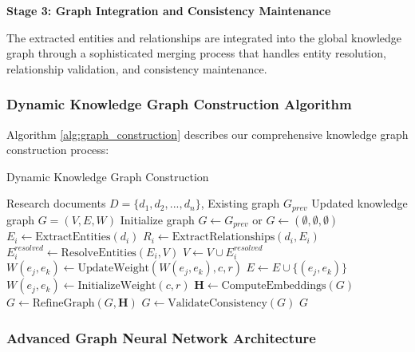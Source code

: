 \documentclass[10pt,twocolumn]{article}
\begin{document}
\textbf{Stage 3: Graph Integration and Consistency Maintenance}

The extracted entities and relationships are integrated into the global knowledge graph through a sophisticated merging process that handles entity resolution, relationship validation, and consistency maintenance.

\subsubsection{Dynamic Knowledge Graph Construction Algorithm}

Algorithm \ref{alg:graph_construction} describes our comprehensive knowledge graph construction process:

\begin{algorithm}[H]
\caption{Dynamic Knowledge Graph Construction}
\label{alg:graph_construction}
\begin{algorithmic}[1]
\REQUIRE Research documents $D = \{d_1, d_2, ..., d_n\}$, Existing graph $G_{prev}$
\ENSURE Updated knowledge graph $G = (V, E, W)$
\STATE Initialize graph $G \leftarrow G_{prev}$ or $G \leftarrow (\emptyset, \emptyset, \emptyset)$
    \STATE $E_i \leftarrow \text{ExtractEntities}(d_i)$ 
    \STATE $R_i \leftarrow \text{ExtractRelationships}(d_i, E_i)$ 
    \STATE $E_i^{resolved} \leftarrow \text{ResolveEntities}(E_i, V)$
    \STATE $V \leftarrow V \cup E_i^{resolved}$
            \STATE $W(e_j, e_k) \leftarrow \text{UpdateWeight}(W(e_j, e_k), c, r)$
        \ELSE
            \STATE $E \leftarrow E \cup \{(e_j, e_k)\}$
            \STATE $W(e_j, e_k) \leftarrow \text{InitializeWeight}(c, r)$
        \ENDIF
    \ENDFOR
\ENDFOR
\STATE $\mathbf{H} \leftarrow \text{ComputeEmbeddings}(G)$ 
\STATE $G \leftarrow \text{RefineGraph}(G, \mathbf{H})$ 
\STATE $G \leftarrow \text{ValidateConsistency}(G)$ 
\RETURN $G$
\end{algorithmic}
\end{algorithm}

\subsubsection{Advanced Graph Neural Network Architecture}
\end{document}
